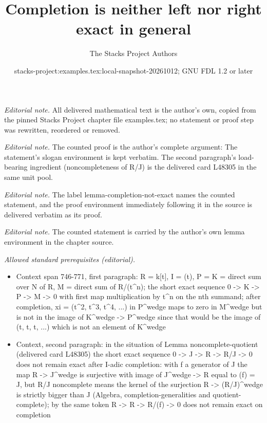 \documentclass[10pt,a4paper]{amsart}
\title{Completion is neither left nor right exact in general}
\author{The Stacks Project Authors}
\date{stacks-project:examples.tex:local-snapshot-20261012; GNU FDL 1.2 or later}
\theoremstyle{plain}
\theoremstyle{definition}
\theoremstyle{remark}
\numberwithin{equation}{subsection}
\begin{document}
\maketitle
\noindent\textit{Editorial note.} All delivered mathematical text is the author's own, copied from the pinned Stacks Project chapter file examples.tex; no statement or proof step was rewritten, reordered or removed.\par\medskip
\noindent\textit{Editorial note.} The counted proof is the author's complete argument: The statement's slogan environment is kept verbatim. The second paragraph's load-bearing ingredient (noncompleteness of R/J) is the delivered card L48305 in the same unit pool.\par\medskip
\noindent\textit{Editorial note.} The label lemma-completion-not-exact names the counted statement, and the proof environment immediately following it in the source is delivered verbatim as its proof.\par\medskip
\noindent\textit{Editorial note.} The counted statement is carried by the author's own lemma environment in the chapter source.\par\medskip
\noindent\textit{Allowed standard prerequisites (editorial).}\begin{itemize}
\item Context span 746-771, first paragraph: R = k[t], I = (t), P = K = direct sum over N of R, M = direct sum of R/(t\textasciicircum{}n); the short exact sequence 0 -> K -> P -> M -> 0 with first map multiplication by t\textasciicircum{}n on the nth summand; after completion, xi = (t\textasciicircum{}2, t\textasciicircum{}3, t\textasciicircum{}4, ...) in P\textasciicircum{}wedge maps to zero in M\textasciicircum{}wedge but is not in the image of K\textasciicircum{}wedge -> P\textasciicircum{}wedge since that would be the image of (t, t, t, ...) which is not an element of K\textasciicircum{}wedge
\item Context, second paragraph: in the situation of Lemma noncomplete-quotient (delivered card L48305) the short exact sequence 0 -> J -> R -> R/J -> 0 does not remain exact after I-adic completion: with f a generator of J the map R -> J\textasciicircum{}wedge is surjective with image of J\textasciicircum{}wedge -> R equal to (f) = J, but R/J noncomplete means the kernel of the surjection R -> (R/J)\textasciicircum{}wedge is strictly bigger than J (Algebra, completion-generalities and quotient-complete); by the same token R -> R -> R/(f) -> 0 does not remain exact on completion
\end{itemize}\medskip
\end{document}
